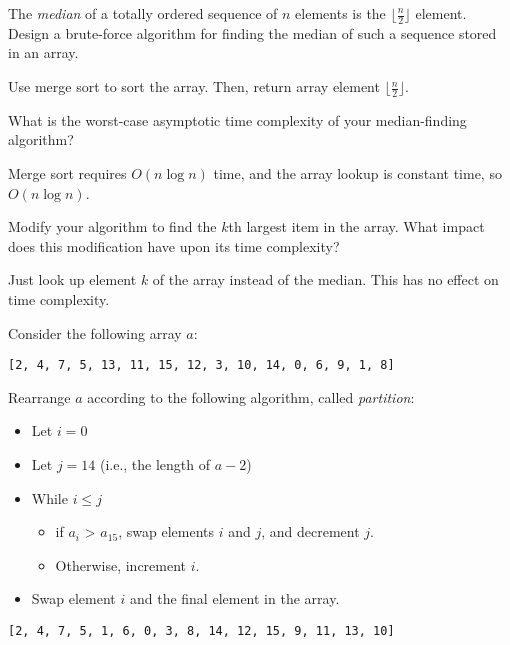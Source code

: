 \documentclass{tufte-handout}
\begin{document}
\begin{questions}
\item The \emph{median} of a totally ordered sequence of $n$ elements is the $\lfloor \frac{n}{2} \rfloor$ element. Design a brute-force algorithm for finding the median of such a sequence stored in an array.

{\color{red} Use merge sort to sort the array. Then, return array element $\lfloor \frac{n}{2} \rfloor$.}

\item What is the worst-case asymptotic time complexity of your median-finding algorithm?

{\color{red} Merge sort requires $O(n \log n)$ time, and the array lookup is constant time, so $O(n \log n)$.}

\item Modify your algorithm to find the $k$th largest item in the array. What impact does this modification have upon its time complexity?

{\color{red} Just look up element $k$ of the array instead of the median. This has no effect on time complexity.}

\item Consider the following array $a$:

\begin{verbatim}
[2, 4, 7, 5, 13, 11, 15, 12, 3, 10, 14, 0, 6, 9, 1, 8]
\end{verbatim}

Rearrange $a$ according to the following algorithm, called \emph{partition}:
\begin{itemize}
    \item Let $i = 0$
    \item Let $j = 14$ (i.e., the length of $a - 2$)
    \item While $i \le j$
    \begin{itemize}
        \item if $a_i$ > $a_{15}$, swap elements $i$ and $j$, and decrement $j$.
        \item Otherwise, increment $i$.
    \end{itemize}
    \item Swap element $i$ and the final element in the array.
\end{itemize}

{\color{red} 
\begin{verbatim}
[2, 4, 7, 5, 1, 6, 0, 3, 8, 14, 12, 15, 9, 11, 13, 10]
\end{verbatim}
}


\end{questions}
\end{document}
